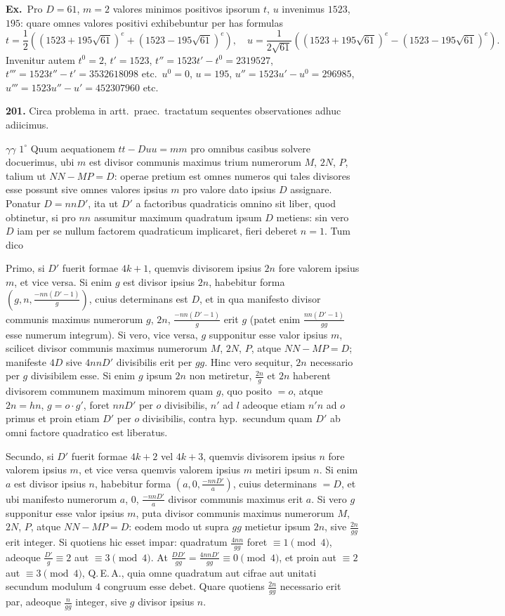\documentclass[12pt,a4paper]{article}
\theoremstyle{plain}
\theoremstyle{definition}
\theoremstyle{remark}
\begin{document}
\textbf{Ex.}\ Pro $D=61$, $m=2$ valores minimos positivos ipsorum $t$, $u$ invenimus $1523$, $195$: quare omnes valores positivi exhibebuntur per has formulas
\[
t = \frac{1}{2}((1523+195\sqrt{61})^e + (1523-195\sqrt{61})^e),\quad
u = \frac{1}{2\sqrt{61}}((1523+195\sqrt{61})^e - (1523-195\sqrt{61})^e).
\]
Invenitur autem $t^0=2$, $t'=1523$, $t''=1523t'-t^0=2319527$, $t'''=1523t''-t'=3532618098$ etc.\ $u^0=0$, $u=195$, $u''=1523u'-u^0=296985$, $u'''=1523u''-u'=452307960$ etc.

\textbf{201.}
Circa problema in artt.\ praec.\ tractatum sequentes observationes adhuc adiicimus.

$\gamma\gamma$ $1^\circ$ Quum aequationem $tt-Duu=mm$ pro omnibus casibus solvere docuerimus, ubi $m$ est divisor communis maximus trium numerorum $M$, $2N$, $P$, talium ut $NN-MP=D$: operae pretium est omnes numeros qui tales divisores esse possunt sive omnes valores ipsius $m$ pro valore dato ipsius $D$ assignare. Ponatur $D=nnD'$, ita ut $D'$ a factoribus quadraticis omnino sit liber, quod obtinetur, si pro $nn$ assumitur maximum quadratum ipsum $D$ metiens: sin vero $D$ iam per se nullum factorem quadraticum implicaret, fieri deberet $n=1$. Tum dico

Primo, si $D'$ fuerit formae $4k+1$, quemvis divisorem ipsius $2n$ fore valorem ipsius $m$, et vice versa. Si enim $g$ est divisor ipsius $2n$, habebitur forma $(g, n, \frac{-nn(D'-1)}{g})$, cuius determinans est $D$, et in qua manifesto divisor communis maximus numerorum $g$, $2n$, $\frac{-nn(D'-1)}{g}$ erit $g$ (patet enim $\frac{nn(D'-1)}{gg}$ esse numerum integrum). Si vero, vice versa, $g$ supponitur esse valor ipsius $m$, scilicet divisor communis maximus numerorum $M$, $2N$, $P$, atque $NN-MP=D$; manifeste $4D$ sive $4nnD'$ divisibilis erit per $gg$. Hinc vero sequitur, $2n$ necessario per $g$ divisibilem esse. Si enim $g$ ipsum $2n$ non metiretur, $\frac{2n}{g}$ et $2n$ haberent divisorem communem maximum minorem quam $g$, quo posito $=o$, atque $2n=hn$, $g=o\cdot g'$, foret $nnD'$ per $o$ divisibilis, $n'$ ad $l$ adeoque etiam $n'n$ ad $o$ primus et proin etiam $D'$ per $o$ divisibilis, contra hyp.\ secundum quam $D'$ ab omni factore quadratico est liberatus.

Secundo, si $D'$ fuerit formae $4k+2$ vel $4k+3$, quemvis divisorem ipsius $n$ fore valorem ipsius $m$, et vice versa quemvis valorem ipsius $m$ metiri ipsum $n$. Si enim $a$ est divisor ipsius $n$, habebitur forma $(a, 0, \frac{-nnD'}{a})$, cuius determinans $=D$, et ubi manifesto numerorum $a$, $0$, $\frac{-nnD'}{a}$ divisor communis maximus erit $a$. Si vero $g$ supponitur esse valor ipsius $m$, puta divisor communis maximus numerorum $M$, $2N$, $P$, atque $NN-MP=D$: eodem modo ut supra $gg$ metietur ipsum $2n$, sive $\frac{2n}{gg}$ erit integer. Si quotiens hic esset impar: quadratum $\frac{4nn}{gg}$ foret $\equiv 1 \pmod{4}$, adeoque $\frac{D'}{g} \equiv 2$ aut $\equiv 3 \pmod{4}$. At $\frac{DD'}{gg} = \frac{4nnD'}{gg} \equiv 0 \pmod{4}$, et proin aut $\equiv 2$ aut $\equiv 3 \pmod{4}$, Q.\,E.\,A., quia omne quadratum aut cifrae aut unitati secundum modulum $4$ congruum esse debet. Quare quotiens $\frac{2n}{gg}$ necessario erit par, adeoque $\frac{n}{gg}$ integer, sive $g$ divisor ipsius $n$.
\end{document}
